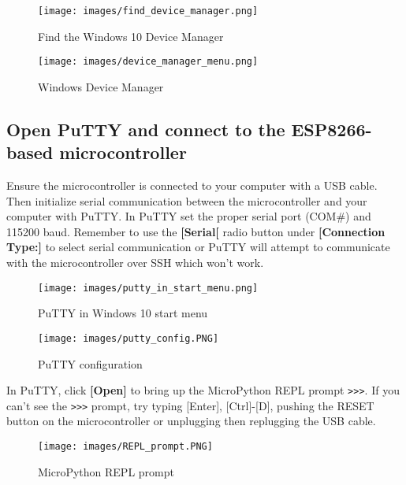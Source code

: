 \documentclass{book}
\makeatletter
\def\maxwidth{\ifdim\Gin@nat@width>\linewidth\linewidth
\else\Gin@nat@width\fi}
\let\Oldincludegraphics\includegraphics
\renewcommand{\includegraphics}[1]{\Oldincludegraphics[width=.8\maxwidth]{#1}}
\newcommand{\passthrough}[1]{#1}
\makeatother
\begin{document}
\begin{figure}
\centering
\texttt{[image: images/find\_device\_manager.png]}
\caption{Find the Windows 10 Device Manager}
\end{figure}

\begin{figure}
\centering
\texttt{[image: images/device\_manager\_menu.png]}
\caption{Windows Device Manager}
\end{figure}
    




    
        \hypertarget{open-putty-and-connect-to-the-esp8266-based-microcontroller}{%
\subsection{Open PuTTY and connect to the ESP8266-based
microcontroller}\label{open-putty-and-connect-to-the-esp8266-based-microcontroller}}
    




    
        Ensure the microcontroller is connected to your computer with a USB
cable. Then initialize serial communication between the microcontroller
and your computer with PuTTY. In PuTTY set the proper serial port
(COM\#) and 115200 baud. Remember to use the \textbf{{[}Serial{[}} radio
button under \textbf{{[}Connection Type:{]}} to select serial
communication or PuTTY will attempt to communicate with the
microcontroller over SSH which won't work.

\begin{figure}
\centering
\texttt{[image: images/putty\_in\_start\_menu.png]}
\caption{PuTTY in Windows 10 start menu}
\end{figure}

\begin{figure}
\centering
\texttt{[image: images/putty\_config.PNG]}
\caption{PuTTY configuration}
\end{figure}

In PuTTY, click \textbf{{[}Open{]}} to bring up the MicroPython REPL
prompt \passthrough{\lstinline!>>>!}. If you can't see the
\passthrough{\lstinline!>>>!} prompt, try typing {[}Enter{]},
{[}Ctrl{]}-{[}D{]}, pushing the RESET button on the microcontroller or
unplugging then replugging the USB cable.

\begin{figure}
\centering
\texttt{[image: images/REPL\_prompt.PNG]}
\caption{MicroPython REPL prompt}
\end{figure}
    
\end{document}
